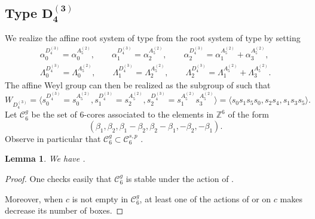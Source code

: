 \documentclass[10pt,a4paper]{amsart}
\newtheorem{Lemma}[Theorem]{Lemma}
\numberwithin{equation}{section}
\begin{document}
\subsection[Type D\_4\^{}(3)]{Type $\boldsymbol{D_{4}^{(3)}}$}

We realize the affine root system of type  from the root system
of type  by setting%
\begin{gather}
\alpha _{0}^{D_{4}^{(3)}}=\alpha _{0}^{A_{5}^{(2)}}, \qquad
\alpha _{1}^{D_{4}^{(3)}}=\alpha _{2}^{A_{5}^{(2)}}, \qquad
\alpha _{2}^{D_{4}^{(3)}}=\alpha _{1}^{A_{5}^{(2)}}+\alpha _{3}^{A_{5}^{(2)}},\nonumber\\
\Lambda _{0}^{D_{4}^{(3)}}=\Lambda _{0}^{A_{5}^{(2)}}, \qquad
\Lambda _{1}^{D_{4}^{(3)}}=\Lambda _{2}^{A_{5}^{(2)}}, \qquad
\Lambda _{2}^{D_{4}^{(3)}}=\Lambda _{1}^{A_{5}^{(2)}}+\Lambda
_{3}^{A_{5}^{(2)}}.\label{relaDG}
\end{gather}
The affine Weyl group  can then be realized as the subgroup
of  such that
\begin{equation*}
W_{D_{4}^{(3)}}=\bigl\langle
s_{0}^{D_{4}^{(3)}}=s_{0}^{A_{5}^{(2)}},s_{1}^{D_{4}^{(3)}}=s_{2}^{A_{5}^{(2)}},s_{2}^{D_{4}^{(3)}}=s_{1}^{A_{5}^{(2)}}s_{3}^{A_{5}^{(2)}}\bigr\rangle =\langle s_{0}s_{1}s_{5}s_{0},s_{2}s_{4},s_{1}s_{3}s_{5}\rangle .
\end{equation*}%
Let $\mathcal{C}_{6}^{g}$ be the set of $6$-cores associated to the elements
in $\mathbb{Z}^{6}$ of the form%
\begin{equation}\label{eq:d43}
(\beta _{1},\beta _{2},\beta _{1}-\beta _{2},\beta _{2}-\beta _{1},-\beta
_{2},-\beta _{1}).
\end{equation}%
Observe in particular that $\mathcal{C}_{6}^{g}\subset \mathcal{C}_{6}^{s,p}$%
.

\begin{Lemma}
	We have .
\end{Lemma}

\begin{proof}
	One checks easily that $\mathcal{C}_{6}^{g}$ is stable under the action of .

Moreover, when $c$ is not empty in $\mathcal{C}_{6}^{g}$,
	at least one of the actions of  or 
	on $c$ makes decrease its number of boxes.
\end{proof}
\end{document}
